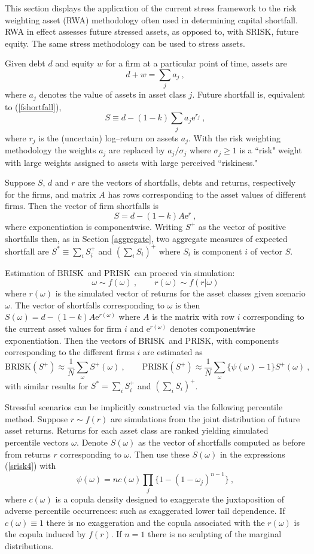 \documentclass[authoryear]{elsarticle}
\newcommand{\e}{\mathrm{e}}
\newcommand{\br}{\ensuremath{\mathrm{BRISK}}}
\newcommand{\pr}{\ensuremath{\mathrm{PRISK}}}
\newcommand{\eref}[1]{(\ref{#1})}
\newcommand{\sref}[1]{Section \ref{#1}}
\newcommand{\cq}{\ , \qquad}
\newcommand{\be}[1]{\begin{equation}\label{#1}}
\newcommand{\ee}{\end{equation}}
\begin{document}
This section displays the application of the current stress framework to  the  risk weighting asset (RWA) methodology often used in determining capital shortfall.   RWA in effect assesses future stressed assets,   as opposed to, with SRISK,  future equity.   The same stress methodology can be used to stress assets.

Given debt $d$ and equity $w$ for a firm at a particular point of time,  assets are
$$
d+w=\sum_ja_j\ ,
$$
where $a_j$ denotes the value of assets in asset class $j$.   Future shortfall is, equivalent to \eref{fshortfall},  
\be{shortfall2}
S\equiv  d-(1-k)\sum_ja_j\e^{r_j}\ ,
\ee
where $r_j$ is the (uncertain) log--return on assets $a_j$.  With the risk weighting methodology the weights $a_j$  are replaced by $a_j/\sigma_j$ where $\sigma_j\ge 1$ is a ``risk" weight with large  weights assigned to  assets  with large perceived ``riskiness." 

Suppose $S$, $d$ and $r$ are the vectors of shortfalls, debts  and returns, respectively for the firms, and matrix $A$ has rows corresponding to the asset values of different firms.  Then the vector of firm shortfalls is
$$
S = d-(1-k)A\e^{r}\ ,
$$ 
where  exponentiation is componentwise.   Writing $S^+$ as the vector of positive shortfalls then, as in \sref{aggregate}, two aggregate measures of expected shortfall are $S^*\equiv \sum_iS_i^+$ and $(\sum_iS_i)^+$ where $S_i$ is component $i$ of vector $S$.

Estimation of \br\ and \pr\ can proceed via simulation:
$$
\omega\sim f(\omega)\cq r(\omega)\sim f(r|\omega)
$$
where $r(\omega)$ is  the simulated vector of returns for the asset classes given scenario $\omega$.   The vector of shortfalls corresponding to $\omega$ is then $S(\omega)=d-(1-k) A\e^{r(\omega)}$  where $A$ is the matrix with row $i$ corresponding to the current asset values for firm $i$ and $\e^{r(\omega)}$ denotes componentwise exponentiation.   Then the vectors of \br\ and \pr, with components corresponding to the different firms $i$ are estimated as  
\be{srisk4}
\br(S^+)\approx \frac{1}{N}\sum_\omega S^+(\omega)\cq
 \pr(S^+)\approx \frac{1}{N}\sum_\omega  \{\psi(\omega)-1\}S^+(\omega)\ ,
\ee
with similar results for $S^*=\sum_iS_i^+$ and $(\sum_iS_i)^+$.  

Stressful scenarios can be implicitly constructed via the following percentile method.   Suppose $r\sim f(r)$ are simulations from the joint distribution of future asset returns.   Returns for each asset class are  ranked yielding simulated percentile vectors $\omega$.   Denote $S(\omega)$ as the vector of shortfalls computed as before from returns $r$ corresponding to $\omega$.   Then use these $S(\omega)$  in the expressions \eref{srisk4} with
$$
\psi(\omega) = nc(\omega)\prod_j \{1-(1-\omega_j)^{n-1}\}\ ,
$$
where $c(\omega)$ is a copula density designed to exaggerate the juxtaposition of  adverse percentile occurrences: such as exaggerated lower tail dependence.   If $c(\omega)\equiv 1$  there is no exaggeration  and the copula associated with the $r(\omega)$ is the copula induced by $f(r)$.  If $n=1$ there is no sculpting of the marginal distributions.
\end{document}
